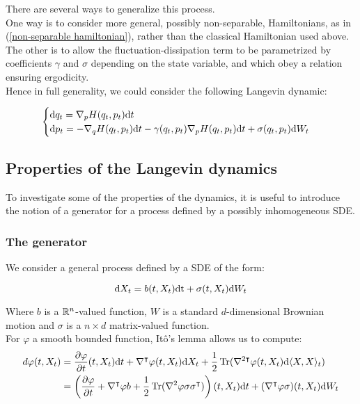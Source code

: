 \begin{remark}
    There are several ways to generalize this process.\\
    One way is to consider more general, possibly non-separable, Hamiltonians, as in (\ref{non-separable hamiltonian}), rather than the classical Hamiltonian used above.\\
    The other is to allow the fluctuation-dissipation term to be parametrized by coefficients $\gamma$ and $\sigma$ depending on the state variable, and which obey a relation ensuring ergodicity.\\
    Hence in full generality, we could consider the following Langevin dynamic:
    
    \begin{equation}
        \label{general Langevin}
        \begin{cases}
            \text dq_t=\nabla_p H(q_t,p_t)\text dt \\
            \text dp_t= -\nabla_q H(q_t,p_t)\text dt -\gamma(q_t,p_t)\nabla_pH(q_t,p_t)\text dt+\sigma(q_t,p_t)\text dW_t
        \end{cases}
    \end{equation}
\end{remark}



\subsection{Properties of the Langevin dynamics}

To investigate some of the properties of the dynamics, it is useful to introduce the notion of a generator for a process defined by a possibly inhomogeneous SDE.
\subsubsection{The generator}
We consider a general process defined by a SDE of the form:

\begin{equation}
    \label{SDE}
    \text dX_t=b(t,X_t)\text {\text dt} + \sigma(t,X_t)\text dW_t
\end{equation}

Where $b$ is a $\mathbb{R}^n$-valued function, $W$ is a standard $d$-dimensional Brownian motion and $\sigma$ is a $n\times d$ matrix-valued function.\\
For $\varphi$ a smooth bounded function, Itô's lemma allows us to compute:
\begin{align*}
    d\varphi(t,X_t) &=\frac{\partial \varphi}{\partial t}(t,X_t)\text dt + \nabla^\intercal \varphi(t,X_t) \text dX_t + \frac12 \operatorname{Tr}(\nabla^{2\intercal}\varphi(t,X_t)\text d\langle X ,X\rangle _t)\\
    &=\left( \frac{\partial \varphi}{\partial t} + \nabla^{\intercal}\varphi b + \frac12 \operatorname{Tr}(\nabla^2\varphi \sigma\sigma^\intercal) \right)(t,X_t) \text dt+ (\nabla^\intercal \varphi\sigma )(t,X_t)\text dW_t
\end{align*}

